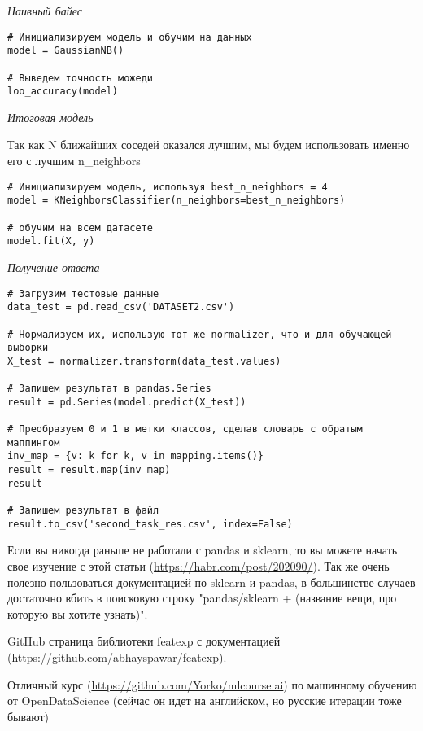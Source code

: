 \textit{Наивный байес}

\begin{verbatim}
# Инициализируем модель и обучим на данных
model = GaussianNB()

# Выведем точность можеди
loo_accuracy(model)
\end{verbatim}

\textit{Итоговая модель}

Так как N ближайших соседей оказался лучшим, мы будем использовать именно его с лучшим n\_neighbors

\begin{verbatim}
# Инициализируем модель, используя best_n_neighbors = 4
model = KNeighborsClassifier(n_neighbors=best_n_neighbors)

# обучим на всем датасете
model.fit(X, y)
\end{verbatim}

\textit{Получение ответа}

\begin{verbatim}
# Загрузим тестовые данные
data_test = pd.read_csv('DATASET2.csv')

# Нормализуем их, использую тот же normalizer, что и для обучающей выборки
X_test = normalizer.transform(data_test.values)

# Запишем результат в pandas.Series
result = pd.Series(model.predict(X_test))

# Преобразуем 0 и 1 в метки классов, сделав словарь с обратым маппингом
inv_map = {v: k for k, v in mapping.items()}
result = result.map(inv_map)
result

# Запишем результат в файл
result.to_csv('second_task_res.csv', index=False)
\end{verbatim}

Если вы никогда раньше не работали с pandas и sklearn, то вы можете начать свое изучение с этой статьи (\url{https://habr.com/post/202090/}). Так же очень полезно пользоваться документацией по sklearn и pandas, в большинстве случаев достаточно вбить в поисковую строку "pandas/sklearn + (название вещи, про которую вы хотите узнать)".

GitHub страница библиотеки featexp с документацией \\(\url{https://github.com/abhayspawar/featexp}).

Отличный курс (\url{https://github.com/Yorko/mlcourse.ai}) по машинному обучению от OpenDataScience (сейчас он идет на английском, но русские итерации тоже бывают)